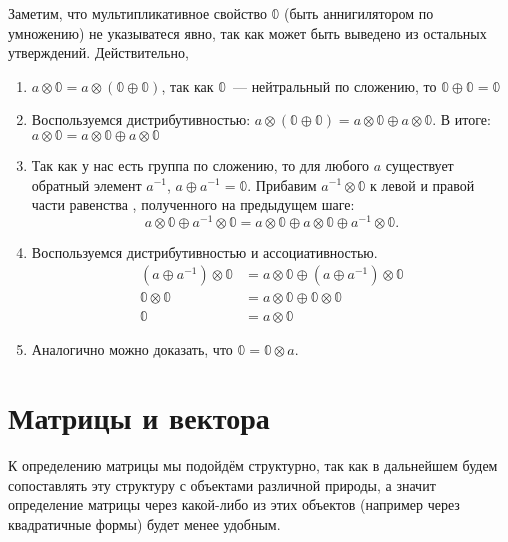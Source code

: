 Заметим, что мультипликативное свойство $\Bbbzero$ (быть аннигилятором по умножению) не указыватеся явно, так как может быть выведено из остальных утверждений.
Действительно,
\begin{enumerate}
    \item $a \otimes \Bbbzero = a \otimes (\Bbbzero \oplus \Bbbzero)$, так как $\Bbbzero$~--- нейтральный по сложению, то $\Bbbzero \oplus \Bbbzero = \Bbbzero$
    \item Воспользуемся дистрибутивностью: $a \otimes (\Bbbzero \oplus \Bbbzero) = a \otimes \Bbbzero \oplus a \otimes \Bbbzero$.
          В итоге: $a \otimes \Bbbzero = a \otimes \Bbbzero \oplus a \otimes \Bbbzero$
    \item Так как у нас есть группа по сложению, то для любого $a$ существует обратный элемент $a^{-1}$, $a \oplus a^{-1} = \Bbbzero$.
          Прибавим $a^{-1} \otimes \Bbbzero$ к левой и правой части равенства%
          , полученного на предыдущем шаге:
          \[a \otimes \Bbbzero \oplus a^{-1} \otimes \Bbbzero = a \otimes \Bbbzero \oplus a \otimes \Bbbzero \oplus a^{-1} \otimes \Bbbzero.\]
    \item Воспользуемся дистрибутивностью и ассоциативностью.
          \begin{align*}
              (a \oplus a^{-1}) \otimes \Bbbzero & = a \otimes \Bbbzero \oplus (a  \oplus a^{-1}) \otimes \Bbbzero \\
              \Bbbzero \otimes \Bbbzero          & = a \otimes \Bbbzero \oplus \Bbbzero \otimes \Bbbzero           \\
              \Bbbzero                           & = a \otimes \Bbbzero
          \end{align*}
    \item Аналогично можно доказать, что $\Bbbzero = \Bbbzero \otimes a$.
\end{enumerate}


\section{Матрицы и вектора}

К определению матрицы мы подойдём структурно, так как в дальнейшем будем сопоставлять эту структуру с объектами различной природы, а значит определение матрицы через какой-либо из этих объектов (например через квадратичные формы) будет менее удобным.

